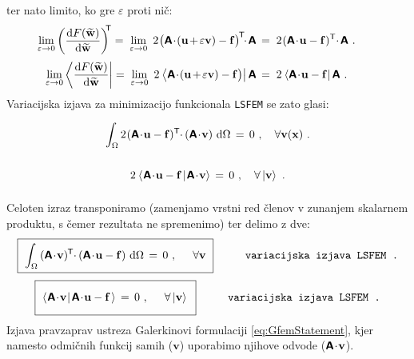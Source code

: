 ter nato limito, ko gre $\varepsilon$ proti nič:
\begin{equation*}
	\hspace{-7mm}
	\lim_{\varepsilon \rightarrow 0} \left(\frac{\ud F(\widetilde{\mathbf{w}})}{\ud \widetilde{\mathbf{w}}}\right)^\mathsf{\mkern-7mu T}
	=
	\mkern5mu \lim_{\varepsilon \rightarrow 0} \ 2 \mkern1mu \big(\mathbsf{A} \! \cdot \! (\mathbf{u} \mkern-2mu + \mkern-2mu \varepsilon \mathbf{v}) - \mathbf{f}\big)^\mathsf{\mkern-2mu T} \mkern-6mu \cdot \mkern-2mu \mathbsf{A}\,
	=
	\mkern5mu 2 \mkern1mu (\mathbsf{A} \! \cdot \! \mathbf{u} - \mathbf{f})^\mathsf{T} \mkern-4mu \cdot \mkern-2mu \mathbsf{A} \ .
\end{equation*}
\begin{equation*}
	\hspace{-7mm}
	\lim_{\varepsilon \rightarrow 0} \bra{\frac{\ud F(\widetilde{\mathbf{w}})}{\ud \widetilde{\mathbf{w}}}}
	=
	\mkern5mu \lim_{\varepsilon \rightarrow 0} \ 2 \mkern1mu \bra{\mathbsf{A} \! \cdot \! (\mathbf{u} \mkern-2mu + \mkern-2mu \varepsilon \mathbf{v}) - \mathbf{f}\big)} \mathbsf{A}\,
	=
	\mkern5mu 2 \mkern1mu \bra{\mathbsf{A} \! \cdot \! \mathbf{u} - \mathbf{f}} \mathbsf{A} \ .
\end{equation*}
Variacijska izjava za minimizacijo funkcionala \texttt{LSFEM} se zato glasi:
\begin{equation*}
	\int_{\Omega} 2 \mkern1mu (\mathbsf{A} \! \cdot \! \mathbf{u} - \mathbf{f})^\mathsf{T} \mkern-4.5mu \cdot \mkern-1mu (\mathbsf{A} \! \cdot \! \mathbf{v}) \ \ud \Omega \, = \, 0 \ , \quad \forall \mathbf{v(\mathbf{x})} \ . \vphantom{\Biggr{)}}
\end{equation*}
\begin{equation*}
	2 \mkern1mu \bra{\mkern1mu \mathbsf{A} \! \cdot \! \mathbf{u} - \mathbf{f} \mkern2mu}\ket{\mkern1mu \mathbsf{A} \! \cdot \! \mathbf{v}} \, = \, 0 \ , \quad \forall \ket{\mathbf{v}} \ . \vphantom{\Biggr{)}}
\end{equation*}
Celoten izraz transponiramo (zamenjamo vrstni red členov v zunanjem skalarnem produktu, s čemer rezultata ne spremenimo) ter delimo z dve:
\begin{equation}
	\boxed{\
		\int_{\Omega} \, (\mathbsf{A} \! \cdot \! \mathbf{v})^\mathsf{\mkern-1mu T} \mkern-4.5mu \cdot \mkern-1mu (\mathbsf{A} \! \cdot \! \mathbf{u} - \mathbf{f}) \ \ud \Omega \, = \,
		0 \ , \hspace{5mm} \forall \mathbf{v} \vphantom{\bigg{)}} \
	}
	\hspace{10mm} \texttt{variacijska izjava LSFEM .}
	\label{eq:LsfemVariationalStatement1}
\end{equation}
\begin{equation}
	\boxed{\
		\bra{\mkern1mu \mathbsf{A} \! \cdot \! \mathbf{v} \mkern1mu}\ket{\mkern2mu \mathbsf{A} \! \cdot \! \mathbf{u} - \mathbf{f} \mkern2mu} \, = \,
		0 \ , \hspace{5mm} \forall \ket{\mathbf{v}} \vphantom{\bigg{)}} \
	}
	\hspace{10mm} \texttt{variacijska izjava LSFEM .}
	\label{eq:LsfemVariationalStatement}
\end{equation}
Izjava pravzaprav ustreza Galerkinovi formulaciji \eqref{eq:GfemStatement}, kjer namesto odmičnih funkcij samih ($\mathbf{v}$) uporabimo njihove odvode ($\bm{\mathsf{A}} \! \cdot \! \mathbf{v}$).